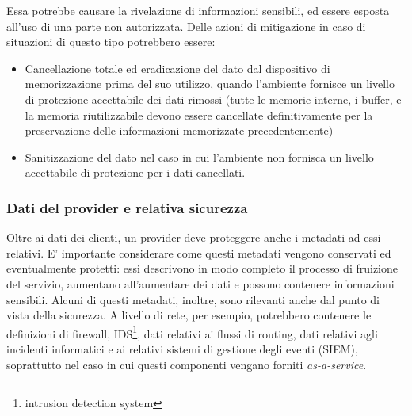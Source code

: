 Essa potrebbe causare la rivelazione di informazioni sensibili, ed essere esposta all'uso di una parte non autorizzata.
Delle azioni di mitigazione in caso di situazioni di questo tipo potrebbero essere:
\begin{itemize}
\item Cancellazione totale ed eradicazione del dato dal dispositivo di memorizzazione prima del suo utilizzo, quando l'ambiente fornisce un livello di protezione accettabile dei dati rimossi (tutte le memorie interne, i buffer, e la memoria riutilizzabile devono essere cancellate definitivamente per la preservazione delle informazioni memorizzate precedentemente)
\item Sanitizzazione del dato nel caso in cui l'ambiente non fornisca un livello accettabile di protezione per i dati cancellati.
\end{itemize}
\subsubsection{Dati del provider e relativa sicurezza}
Oltre ai dati dei clienti, un provider deve proteggere anche i metadati ad essi relativi. E' importante considerare come questi metadati vengono conservati ed eventualmente protetti: essi descrivono in modo completo il processo di fruizione del servizio, aumentano all'aumentare dei dati e possono contenere informazioni sensibili.
Alcuni di questi metadati, inoltre, sono rilevanti anche dal punto di vista della sicurezza. A livello di rete, per esempio, potrebbero contenere le definizioni di firewall, IDS\footnote{intrusion detection system}, dati relativi ai flussi di routing, dati relativi agli incidenti informatici e ai relativi sistemi di gestione degli eventi (SIEM), soprattutto nel caso in cui questi componenti vengano forniti \textit{as-a-service}.\cite{CloudSecurityBook}

